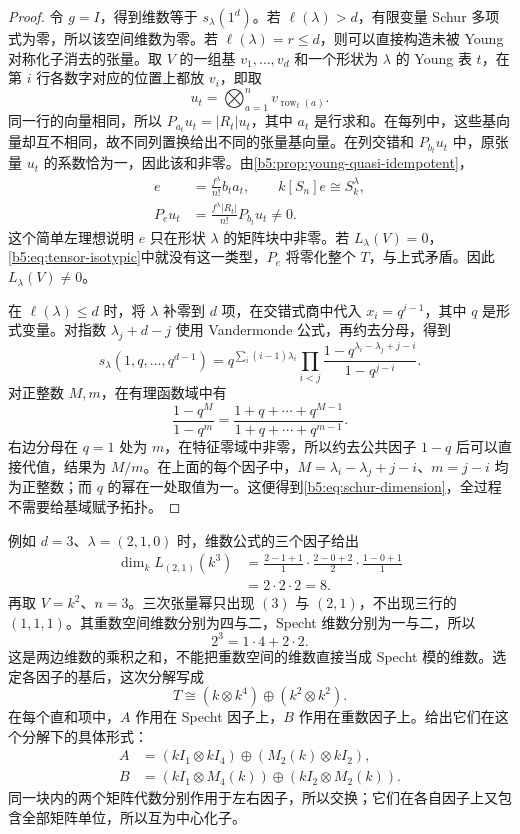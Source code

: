 \begin{proof}
	令 \(g=I\)，得到维数等于 \(s_\lambda(1^d)\)。若 \(\ell(\lambda)>d\)，有限变量 Schur 多项式为零，所以该空间维数为零。若 \(\ell(\lambda)=r\le d\)，则可以直接构造未被 Young 对称化子消去的张量。取 \(V\) 的一组基 \(v_1,\ldots,v_d\) 和一个形状为 \(\lambda\) 的 Young 表 \(t\)，在第 \(i\) 行各数字对应的位置上都放 \(v_i\)，即取
	\[
		u_t=\bigotimes_{a=1}^n v_{\operatorname{row}_t(a)}.
	\]
	同一行的向量相同，所以 \(P_{a_t}u_t=|R_t|u_t\)，其中 \(a_t\) 是行求和。在每列中，这些基向量却互不相同，故不同列置换给出不同的张量基向量。在列交错和 \(P_{b_t}u_t\) 中，原张量 \(u_t\) 的系数恰为一，因此该和非零。由\cref{b5:prop:young-quasi-idempotent}，
	\[
		\begin{aligned}
			e&=\frac{f^\lambda}{n!}b_ta_t, \qquad k[S_n]e\cong S_k^\lambda,\\
			P_eu_t&=\frac{f^\lambda|R_t|}{n!}P_{b_t}u_t\ne0.
		\end{aligned}
	\]
	这个简单左理想说明 \(e\) 只在形状 \(\lambda\) 的矩阵块中非零。若 \(L_\lambda(V)=0\)，\eqref{b5:eq:tensor-isotypic}中就没有这一类型，\(P_e\) 将零化整个 \(T\)，与上式矛盾。因此 \(L_\lambda(V)\ne0\)。

	在 \(\ell(\lambda)\le d\) 时，将 \(\lambda\) 补零到 \(d\) 项，在交错式商中代入 \(x_i=q^{i-1}\)，其中 \(q\) 是形式变量。对指数 \(\lambda_j+d-j\) 使用 Vandermonde 公式，再约去分母，得到
	\[
		s_\lambda(1,q,\ldots,q^{d-1}) =q^{\sum_i(i-1)\lambda_i} \prod_{i<j}\frac{1-q^{\lambda_i-\lambda_j+j-i}}{1-q^{j-i}}.
	\]
	对正整数 \(M,m\)，在有理函数域中有
	\[
		\frac{1-q^M}{1-q^m} =\frac{1+q+\cdots+q^{M-1}}{1+q+\cdots+q^{m-1}}.
	\]
	右边分母在 \(q=1\) 处为 \(m\)，在特征零域中非零，所以约去公共因子 \(1-q\) 后可以直接代值，结果为 \(M/m\)。在上面的每个因子中，\(M=\lambda_i-\lambda_j+j-i\)、\(m=j-i\) 均为正整数；而 \(q\) 的幂在一处取值为一。这便得到\eqref{b5:eq:schur-dimension}，全过程不需要给基域赋予拓扑。
\end{proof}

例如 \(d=3\)、\(\lambda=(2,1,0)\) 时，维数公式的三个因子给出
\[
	\begin{aligned}
		\dim_k L_{(2,1)}(k^3) &=\frac{2-1+1}{1}\cdot\frac{2-0+2}{2}\cdot\frac{1-0+1}{1}\\
		&=2\cdot2\cdot2=8.
	\end{aligned}
\]
再取 \(V=k^2\)、\(n=3\)。三次张量幂只出现 \((3)\) 与 \((2,1)\)，不出现三行的 \((1,1,1)\)。其重数空间维数分别为四与二，Specht 维数分别为一与二，所以
\[
	2^3=1\cdot4+2\cdot2.
\]
这是两边维数的乘积之和，不能把重数空间的维数直接当成 Specht 模的维数。选定各因子的基后，这次分解写成
\[
	T\cong(k\otimes k^4)\oplus(k^2\otimes k^2).
\]
在每个直和项中，\(A\) 作用在 Specht 因子上，\(B\) 作用在重数因子上。给出它们在这个分解下的具体形式：
\[
	\begin{aligned}
		A&=(kI_1\otimes kI_4)\oplus(M_2(k)\otimes kI_2),\\
		B&=(kI_1\otimes M_4(k))\oplus(kI_2\otimes M_2(k)).
	\end{aligned}
\]
同一块内的两个矩阵代数分别作用于左右因子，所以交换；它们在各自因子上又包含全部矩阵单位，所以互为中心化子。

